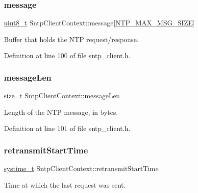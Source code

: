 \subsubsection{\texorpdfstring{message}{message}}
{\footnotesize\ttfamily \hyperlink{stdint_8h_aba7bc1797add20fe3efdf37ced1182c5}{uint8\+\_\+t} Sntp\+Client\+Context\+::message\mbox{[}\hyperlink{ntp__common_8h_a5820e5e5d218c5509145b98842d55c70}{N\+T\+P\+\_\+\+M\+A\+X\+\_\+\+M\+S\+G\+\_\+\+S\+I\+ZE}\mbox{]}}



Buffer that holds the N\+TP request/response. 



Definition at line 100 of file sntp\+\_\+client.\+h.

\mbox{\label{structSntpClientContext_a488494d0644f9278a86389cb442aa49e}} 
\subsubsection{\texorpdfstring{message\+Len}{messageLen}}
{\footnotesize\ttfamily size\+\_\+t Sntp\+Client\+Context\+::message\+Len}



Length of the N\+TP message, in bytes. 



Definition at line 101 of file sntp\+\_\+client.\+h.

\mbox{\label{structSntpClientContext_a15b1f25abf336af057af833edb2ef979}} 
\subsubsection{\texorpdfstring{retransmit\+Start\+Time}{retransmitStartTime}}
{\footnotesize\ttfamily \hyperlink{compiler__port_8h_ae3e32a98d431a02106616da3071832dd}{systime\+\_\+t} Sntp\+Client\+Context\+::retransmit\+Start\+Time}



Time at which the last request was sent. 



